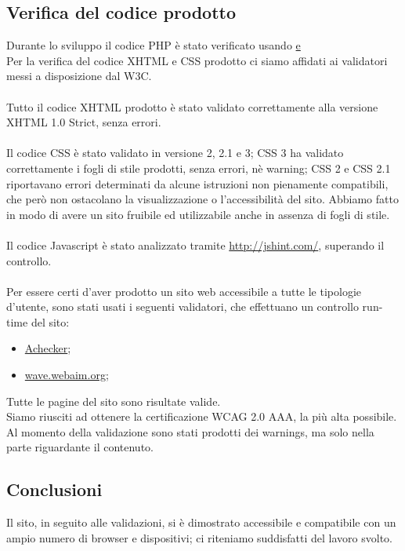 {	\subsection{Verifica del codice prodotto}{
		Durante lo sviluppo il codice PHP è stato verificato  usando \href{http://phpcodechecker.com/} e \href{http://phpfiddle.org/}
		\\
		Per la verifica del codice XHTML e CSS prodotto ci siamo affidati ai validatori messi a disposizione dal W3C.\\
		\\
		Tutto il codice XHTML prodotto è stato validato correttamente alla versione XHTML 1.0 Strict, senza errori.\\
		\\
		Il codice CSS è stato validato in versione 2, 2.1 e 3; CSS 3 ha validato correttamente i fogli di stile prodotti, senza errori, nè warning; CSS 2 e CSS 2.1 riportavano errori determinati da alcune istruzioni non pienamente compatibili, che però non ostacolano la visualizzazione o l'accessibilità del sito. Abbiamo fatto in modo di avere un sito fruibile ed utilizzabile anche in assenza di fogli di stile.\\
		\\
		Il codice Javascript è stato analizzato tramite \url{http://jshint.com/}, superando il controllo.\\
		\\
		Per essere certi d'aver prodotto un sito web accessibile a tutte le tipologie d'utente, sono stati usati i seguenti validatori, che effettuano un controllo run-time del sito:
		\begin{itemize}\itemsep1pt
			\item \href{http://achecker.ca/checker/index.php}{Achecker};
			\item \href{http://wave.webaim.org/}{wave.webaim.org};
		\end{itemize}
		Tutte le pagine del sito sono risultate valide.\\
		Siamo riusciti ad ottenere la certificazione WCAG 2.0 AAA, la più alta possibile. Al momento della validazione sono stati prodotti dei warnings, ma solo nella parte riguardante il contenuto. 
	}
	
	\subsection{Conclusioni}
		Il sito, in seguito alle validazioni, si è dimostrato accessibile e compatibile con un ampio numero di browser e dispositivi; ci riteniamo suddisfatti del lavoro svolto.
}